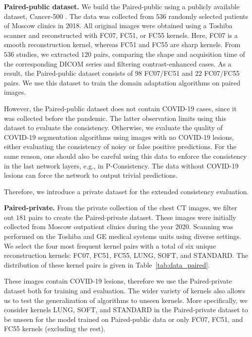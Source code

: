 \textbf{Paired-public dataset.} We build the Paired-public using a publicly available dataset, Cancer-500 \cite{morozov2021simplified}. The data was collected from $536$ randomly selected patients of Moscow clinics in 2018. All original images were obtained using a Toshiba scanner and reconstructed with FC07, FC51, or FC55 kernels. Here, FC07 is a smooth reconstruction kernel, whereas FC51 and FC55 are sharp kernels. From $536$ studies, we extracted $120$ pairs, comparing the shape and acquisition time of the corresponding DICOM series and filtering contrast-enhanced cases. As a result, the Paired-public dataset consists of $98$ FC07/FC51 and $22$ FC07/FC55 pairs. We use this dataset to train the domain adaptation algorithms on paired images. %

However, the Paired-public dataset does not contain COVID-19 cases, since it was collected before the pandemic. The latter observation limits using this dataset to evaluate the consistency. Otherwise, we evaluate the quality of COVID-19 segmentation algorithms using images with no COVID-19 lesions, either evaluating the consistency of noisy or false positive predictions. For the same reason, one should also be careful using this data to enforce the consistency in the last network layers, e.g., in P-Consistency. The data without COVID-19 lesions can force the network to output trivial predictions.

Therefore, we introduce a private dataset for the extended consistency evaluation.


\textbf{Paired-private.} From the private collection of the chest CT images, we filter out $181$ pairs to create the Paired-private dataset. These images were initially collected from Moscow outpatient clinics during the year 2020. Scanning was performed on the Toshiba and GE medical systems units using diverse settings. We select the four most frequent kernel pairs with a total of six unique reconstruction kernels: FC07, FC51, FC55, LUNG, SOFT, and STANDARD. The distribution of these kernel pairs is given in Table~\ref{tab:data_paired}.

These images contain COVID-19 lesions, therefore we use the Paired-private dataset both for training and evaluation. The wider variety of kernels also allows us to test the generalization of algorithms to unseen kernels. More specifically, we consider kernels LUNG, SOFT, and STANDARD in the Paired-private dataset to be unseen for the model trained on Paired-public data or only FC07, FC51, and FC55 kernels (excluding the rest).



